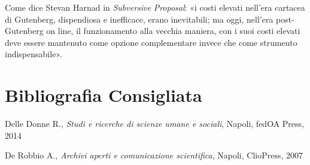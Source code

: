 Come dice Stevan Harnad in \emph{Subversive} \emph{Proposal}: «i costi
elevati nell'era cartacea di Gutenberg, dispendiosa e inefficace, erano
inevitabili; ma oggi, nell'era post-Gutenberg on line, il funzionamento
alla vecchia maniera, con i suoi costi elevati deve essere mantenuto
come opzione complementare invece che come strumento indispensabile».

\section*{Bibliografia Consigliata}
{\parindent0pt 
Delle Donne R., \emph{Studi e ricerche di scienze umane e sociali},
Napoli, fedOA Press, 2014

De Robbio A., \emph{Archivi aperti e comunicazione scientifica}, Napoli,
ClioPress, 2007
}

